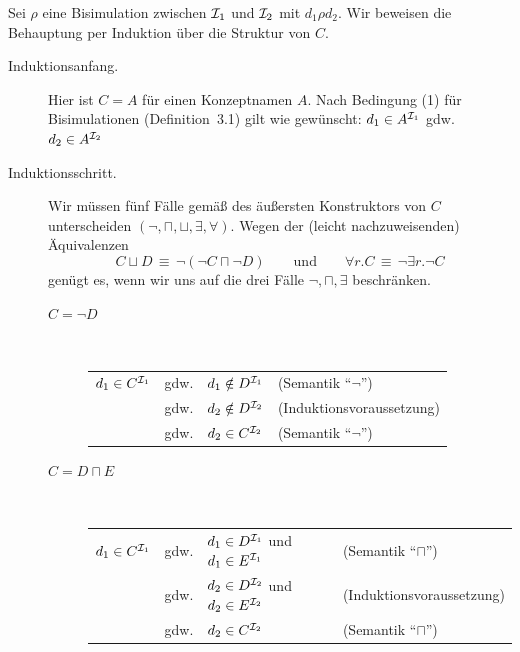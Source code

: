 \documentclass[fontsize=11pt, twoside=false, numbers=autoenddot]{scrbook}
\begin{document}
\par\noindent
\begin{beweis}
  Sei $\rho$ eine Bisimulation zwischen $\mathcal{I}_1$ und $\mathcal{I}_2$ mit $d_1\rho d_2$.
  Wir beweisen die Behauptung per Induktion über die Struktur von $C$.
  \begin{description}
    \item[Induktionsanfang.]
      Hier ist $C=A$ für einen Konzeptnamen $A$.
      Nach Bedingung (1) für Bisimulationen (Definition~3.1) gilt wie gewünscht:
      $d_1 \in A^{\mathcal{I}_1}$ gdw. $d_2 \in A^{\mathcal{I}_2}$
    \item[Induktionsschritt.]
      Wir müssen fünf Fälle gemäß des äußersten Konstruktors
      von $C$ unterscheiden $(\lnot,\sqcap,\sqcup,\exists,\forall)$.
      Wegen der (leicht nachzuweisenden) Äquivalenzen
      \[
        C \sqcup D  \,\equiv\, \lnot(\lnot C \sqcap \lnot D)
        \qquad\text{und}\qquad
        \forall r.C \,\equiv\, \lnot \exists r.\lnot C
      \]
      genügt es, wenn wir uns auf die drei Fälle $\lnot,\sqcap,\exists$ beschränken.
      \begin{description}
        \item[{\boldmath $C=\lnot D$}]
          ~ %
          \parI
          \begin{center}
            \begin{tabular}{@{}llp{40mm}l@{}}
              $d_1 \in C^{\mathcal{I}_1}$ & gdw. & $d_1 \notin D^{\mathcal{I}_1}$ & (Semantik "`$\lnot$"') \\
                                   & gdw. & $d_2 \notin D^{\mathcal{I}_2}$ & (Induktionsvoraussetzung) \\
                                   & gdw. & $d_2 \in C^{\mathcal{I}_2}$    & (Semantik "`$\lnot$"')
            \end{tabular}
          \end{center}
          \parI
        \item[{\boldmath $C=D \sqcap E$}]
          ~ %
          \parI
          \begin{center}
            \begin{tabular}{@{}llp{40mm}l@{}}
              $d_1 \in C^{\mathcal{I}_1}$
              & gdw. & $d_1 \in D^{\mathcal{I}_1}$ und $d_1 \in E^{\mathcal{I}_1}$ & (Semantik "`$\sqcap$"') \\
              & gdw. & $d_2 \in D^{\mathcal{I}_2}$ und $d_2 \in E^{\mathcal{I}_2}$ & (Induktionsvoraussetzung)\\
              & gdw. & $d_2 \in C^{\mathcal{I}_2}$                          & (Semantik "`$\sqcap$"')

\end{tabular}
\end{center}
\end{description}
\end{description}
\end{beweis}
\end{document}
